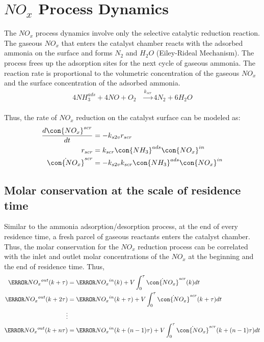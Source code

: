 \section{$NO_x$ Process Dynamics}

The $NO_x$ process dynamics involve only the selective catalytic reduction reaction. The gaseous $NO_x$ that enters the
catalyst chamber reacts with the adsorbed ammonia on the surface and forms $N_2$ and $H_2O$ (Eiley-Rideal Mechanism).
The process frees up the adsorption sites for the next cycle of gaseous ammonia. The reaction rate is proportional to
the volumetric concentration of the gaseous $NO_x$ and the surface concentration of the adsorbed ammonia.
\begin{align}
    4 NH_3 ^{ads} + 4 NO + O_2 &\xrightarrow[]{k_{scr}} 4 N_2 + 6 H_2O
\end{align}

Thus, the rate of $NO_x$ reduction on the catalyst surface can be modeled as:
\begin{align}
    \frac{d \con{NO_x}^{scr}}{dt} &= - k_{s2v} r_{scr} \\
    r_{scr} &= k_{scr} \con{NH_3}^{ads} \con{NO_x}^{in}\\
    \dot{\con{NO_x}}^{scr} &= -k_{s2v} k_{scr} \con{NH_3}^{ads} \con{NO_x}^{in}
\end{align}

\subsection{Molar conservation at the scale of residence time}

Similar to the ammonia adsorption/desorption process, at the end of every residence time, a fresh parcel of gaseous
reactants enters the catalyst chamber. Thus, the molar conservation for the $NO_x$ reduction process can be
correlated with the inlet and outlet molar concentrations of the $NO_x$ at the beginning and the end of residence time. Thus,
\begin{align*}
    \mol{NO_x}^{out} (k + \tau) &= \mol{NO_x}^{in} (k) + V \int_{0}^{\tau}  \dot{\con{NO_x}}^{scr} (k) dt\\
    \mol{NO_x}^{out} (k + 2\tau) &= \mol{NO_x}^{in} (k + \tau) + V \int_{0}^{\tau} \dot{\con{NO_x}}^{scr} (k+\tau)  dt\\
    \vdots &\\
    \mol{NO_x}^{out} (k + n\tau) &= \mol{NO_x}^{in} (k + (n-1)\tau) + V \int_{0}^{\tau} \dot{\con{NO_x}}^{scr} (k+(n-1)\tau) dt
\end{align*}

